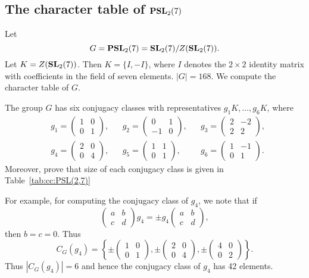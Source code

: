 \subsection{The character table of $\mathbf{PSL}_2(7)$}

Let 
\[
G=\mathbf{PSL}_2(7)=\mathbf{SL}_2(7)/Z(\mathbf{SL}_2(7)).
\]
Let $K=Z(\mathbf{SL}_2(7))$. 
Then $K=\{I,-I\}$, where $I$ denotes the $2\times 2$ identity
matrix with coefficients in the field of seven elements. 
$|G|=168$. We compute the
character table of $G$. 

\begin{exercise}
    The group $G$ has six conjugacy classes with representatives
    $g_1K,\dots,g_6K$, where 
    \begin{align*}
    &g_1=\begin{pmatrix}
         1&0\\
         0&1
         \end{pmatrix},
    &&g_2=\begin{pmatrix}
         0&1\\
         -1&0
         \end{pmatrix},
    &&g_3=\begin{pmatrix}
         2&-2\\
         2&2
         \end{pmatrix},\\
    &g_4=\begin{pmatrix}
         2&0\\
         0&4
         \end{pmatrix},
    &&g_5=\begin{pmatrix}
         1&1\\
         0&1
         \end{pmatrix},
    &&g_6=\begin{pmatrix}
         1&-1\\
         0&1
         \end{pmatrix}.
    \end{align*}
    Moreover, prove that size of each conjugacy class is given in Table~\ref{tab:cc:PSL(2,7)}
\end{exercise}

For example, for computing the conjugacy class
of $g_4$, we note that if 
\[
\begin{pmatrix}
    a&b\\
    c&d
\end{pmatrix}g_4=\pm g_4\begin{pmatrix}
    a&b\\
    c&d
\end{pmatrix},
\]
then $b=c=0$. Thus 
\[
C_G(g_4)=\left\{\pm\begin{pmatrix}
    1&0\\
    0&1
\end{pmatrix},\pm\begin{pmatrix}
    2&0\\
    0&4
\end{pmatrix},\pm\begin{pmatrix}
    4&0\\
    0&2
\end{pmatrix}\right\}.
\]
Thus $|C_G(g_4)|=6$ and 
hence the conjugacy class of $g_4$ has 42 elements. 

